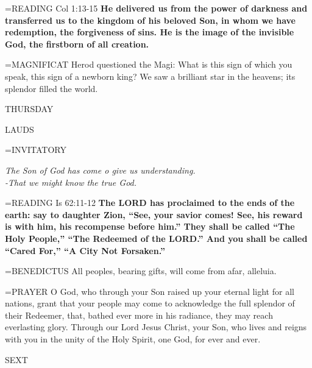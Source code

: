 \hangindent=\parindent \small{\uppercase{READING}}   Col 1:13-15 \textbf{  He delivered us from the power of darkness and transferred us to the kingdom of his beloved Son, in whom we have redemption, the forgiveness of sins. He is the image of the invisible God, the firstborn of all creation.\\}

\hangindent=\parindent \small{MAGNIFICAT 	Herod questioned the Magi: What is this sign of which you speak, this sign of a newborn king? We saw a brilliant star in the heavens; its splendor filled the world.\\}

\begin{center}
\normalsize THURSDAY
\end{center}

\begin{flushleft}\normalsize LAUDS\\\end{flushleft}

\hangindent=\parindent \small{INVITATORY}
\begin{center}
\textit{The Son of God has come o give us understanding.\\}
\textit{-That we might know the true God.\\}
\end{center}

\hangindent=\parindent \small{\uppercase{READING}}    Is 62:11-12 \textbf{   The LORD has proclaimed to the ends of the earth: say to daughter Zion, “See, your savior comes! See, his reward is with him, his recompense before him.” They shall be called “The Holy People,” “The Redeemed of the LORD.” And you shall be called “Cared For,” “A City Not Forsaken.”\\}

\hangindent=\parindent \small{BENEDICTUS 	All peoples, bearing gifts, will come from afar, alleluia.\\}

\hangindent=\parindent \small{PRAYER 	O God, who through your Son raised up your eternal light for all nations, grant that your people may come to acknowledge the full splendor of their Redeemer, that, bathed ever more in his radiance, they may reach everlasting glory. Through our Lord Jesus Christ, your Son, who lives and reigns with you in the unity of the Holy Spirit, one God, for ever and ever.}

\begin{flushleft}\normalsize SEXT\\\end{flushleft}

